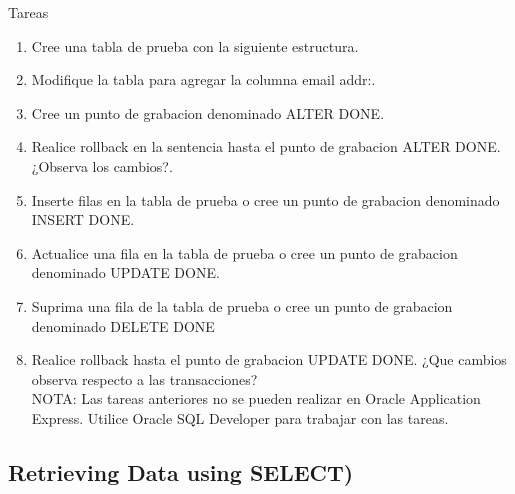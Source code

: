 \documentclass[12pt,letterpaper]{article}
\begin{document}
Tareas\\
\begin{enumerate}[1.]
    \item Cree una tabla de prueba con la siguiente estructura.  
     \item Modifique la tabla para agregar la columna email addr:.\\
   \item Cree un punto de grabacion denominado ALTER DONE.
     \item Realice rollback en la sentencia hasta el punto de grabacion ALTER DONE. ¿Observa los cambios?.
      \item Inserte filas en la tabla de prueba o cree un punto de grabacion denominado INSERT DONE.
      \item Actualice una fila en la tabla de prueba o cree un punto de grabacion denominado UPDATE DONE. 
      \item Suprima una fila de la tabla de prueba o cree un punto de grabacion denominado DELETE DONE
     \item  Realice rollback hasta el punto de grabacion UPDATE DONE. ¿Que cambios observa respecto a las transacciones?\\
      NOTA: Las tareas anteriores no se pueden realizar en Oracle Application Express. Utilice Oracle SQL Developer para trabajar con las tareas.
		\end{enumerate}





\newpage
\subsection{Retrieving Data using SELECT)}
\end{document}
